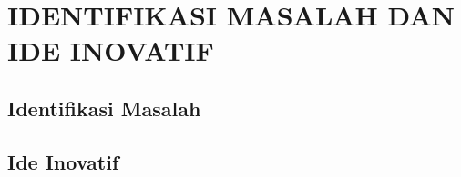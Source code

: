 \chapter{IDENTIFIKASI MASALAH DAN IDE INOVATIF}

\section{Identifikasi Masalah}

\section{Ide Inovatif}